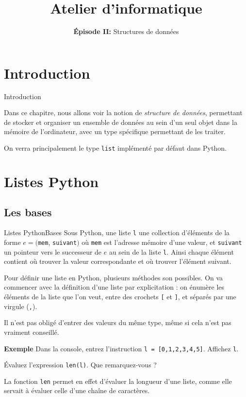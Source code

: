 \documentclass[10pt]{beamer}
\title{Atelier d'informatique}
\subtitle{\textbf{Épisode II:} Structures de données}
\begin{document}
\begin{frame}[fragile]
	\titlepage
\end{frame}

\section{Introduction}

\begin{frame}[fragile]{Introduction}
	
	Dans ce chapitre, nous allons voir la notion de \textit{structure de données}, permettant de stocker et organiser un ensemble de données au sein d'un seul objet dans la mémoire de l'ordinateur, avec un type spécifique permettant de les traiter.
	\pause
	
	On verra principalement le type \lstinline|list| implémenté par défaut dans Python.
\end{frame}

\frame{\tableofcontents}

\section{Listes Python}

\subsection{Les bases}

\begin{frame}[fragile]{Listes Python}{Bases}
	Sous Python, une liste \lstinline|l| une collection d'éléments de la forme $e = ($\lstinline|mem|, \lstinline|suivant|$)$ où \lstinline|mem| est l'adresse mémoire d'une valeur, et \lstinline|suivant| un pointeur vers le successeur de $e$ au sein de la liste \lstinline|l|. Ainsi chaque élément contient où trouver la valeur correspondante et où trouver l'élément suivant.
	\pause
	
	Pour définir une liste en Python, plusieurs méthodes son possibles. On va commencer avec la définition d'une liste par explicitation : on énumère les éléments de la liste que l'on veut, entre des crochets \lstinline|[| et \lstinline|]|, et séparés par une virgule (\lstinline|,|).
	\pause
	
	Il n'est pas obligé d'entrer des valeurs du même type, même si cela n'est pas vraiment conseillé.
	\pause
	
	\begin{block}{\textbf{Exemple}}
		Dans la console, entrez l'instruction \lstinline|l = [0,1,2,3,4,5]|. Affichez \lstinline|l|.
		\pause
		
		Évaluez l'expression \lstinline|len(l)|. Que remarquez-vous ?
	\end{block}
	
	La fonction \lstinline|len| permet en effet d'évaluer la longueur d'une liste, comme elle servait à évaluer celle d'une chaîne de caractères.
\end{frame}
\end{document}
